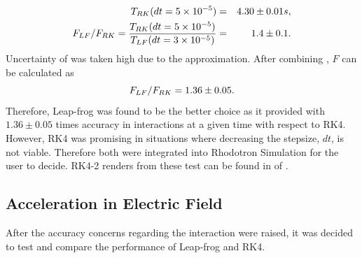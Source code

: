 \documentclass[a4paper,oneside,12pt]{report}
\numberwithin{equation}{chapter}
\begin{document}
{\begin{eqnarray}
    T_{RK}(dt=5 \times 10^{-5})  &=& 4.30 \pm 0.01 s, \\ %
    F_{LF}/F_{RK} = \frac{T_{RK}(dt=5 \times 10^{-5})}{T_{LF}(dt=3 \times 10^{-5})} &=& 1.4 \pm 0.1.
\vspace{-10pt}\end{eqnarray}
\clearpage
Uncertainty of  was taken high due to the approximation. 
After combining , $F$ can be calculated as
\vspace{-10pt}\begin{equation}
    F_{LF}/F_{RK} = 1.36 \pm 0.05.
\vspace{-10pt}\end{equation}
Therefore, Leap-frog was found to be the better choice as it provided with $1.36 \pm 0.05$ times accuracy in \eB interactions at a given time with respect to RK4. However,
RK4 was promising in situations where decreasing the stepsize, $dt$, is not viable. Therefore both were integrated into Rhodotron Simulation for the user to decide.
RK4-2 renders from these test can be found in  of .

\subsection{Acceleration in Electric Field}
After the accuracy concerns regarding the \eB interaction were raised, it was decided to test \eE and compare the performance of Leap-frog and RK4.

}
\end{document}
